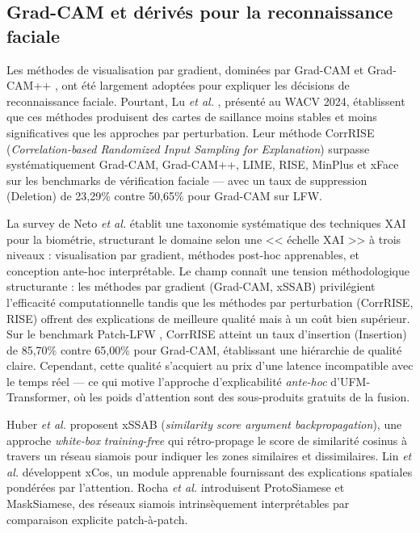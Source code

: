 \documentclass[12pt,a4paper]{report}
\begin{document}
\subsection{Grad-CAM et d\'{e}riv\'{e}s pour la reconnaissance faciale}

Les m\'{e}thodes de visualisation par gradient, domin\'{e}es par Grad-CAM et Grad-CAM++ \cite{selvaraju2017grad}, ont \'{e}t\'{e} largement adopt\'{e}es pour expliquer les d\'{e}cisions de reconnaissance faciale. Pourtant, Lu \textit{et al.} \cite{lu2024corrRISE}, pr\'{e}sent\'{e} au WACV 2024, \'{e}tablissent que ces m\'{e}thodes produisent des cartes de saillance moins stables et moins significatives que les approches par perturbation. Leur m\'{e}thode CorrRISE (\textit{Correlation-based Randomized Input Sampling for Explanation}) surpasse syst\'{e}matiquement Grad-CAM, Grad-CAM++, LIME, RISE, MinPlus et xFace sur les benchmarks de v\'{e}rification faciale --- avec un taux de suppression (Deletion) de 23,29\% contre 50,65\% pour Grad-CAM sur LFW.

La survey de Neto \textit{et al.} \cite{neto2022explainable} \'{e}tablit une taxonomie syst\'{e}matique des techniques XAI pour la biom\'{e}trie, structurant le domaine selon une << \'{e}chelle XAI >> \`{a} trois niveaux : visualisation par gradient, m\'{e}thodes post-hoc apprenables, et conception ante-hoc interpr\'{e}table. Le champ conna\^{i}t une tension m\'{e}thodologique structurante : les m\'{e}thodes par gradient (Grad-CAM, xSSAB) privil\'{e}gient l'efficacit\'{e} computationnelle tandis que les m\'{e}thodes par perturbation (CorrRISE, RISE) offrent des explications de meilleure qualit\'{e} mais \`{a} un co\^{u}t bien sup\'{e}rieur. Sur le benchmark Patch-LFW \cite{huber2024xssab}, CorrRISE atteint un taux d'insertion (Insertion) de 85,70\% contre 65,00\% pour Grad-CAM, \'{e}tablissant une hi\'{e}rarchie de qualit\'{e} claire. Cependant, cette qualit\'{e} s'acquiert au prix d'une latence incompatible avec le temps r\'{e}el --- ce qui motive l'approche d'explicabilit\'{e} \textit{ante-hoc} d'UFM-Transformer, o\`{u} les poids d'attention sont des sous-produits gratuits de la fusion.

Huber \textit{et al.} \cite{huber2024xssab} proposent xSSAB (\textit{similarity score argument backpropagation}), une approche \textit{white-box} \textit{training-free} qui r\'{e}tro-propage le score de similarit\'{e} cosinus \`{a} travers un r\'{e}seau siamois pour indiquer les zones similaires et dissimilaires. Lin \textit{et al.} \cite{lin2021xcos} d\'{e}veloppent xCos, un module apprenable fournissant des explications spatiales pond\'{e}r\'{e}es par l'attention. Rocha \textit{et al.} \cite{rocha2025protosiam} introduisent ProtoSiamese et MaskSiamese, des r\'{e}seaux siamois intrins\`{e}quement interpr\'{e}tables par comparaison explicite patch-\`{a}-patch.
\end{document}
